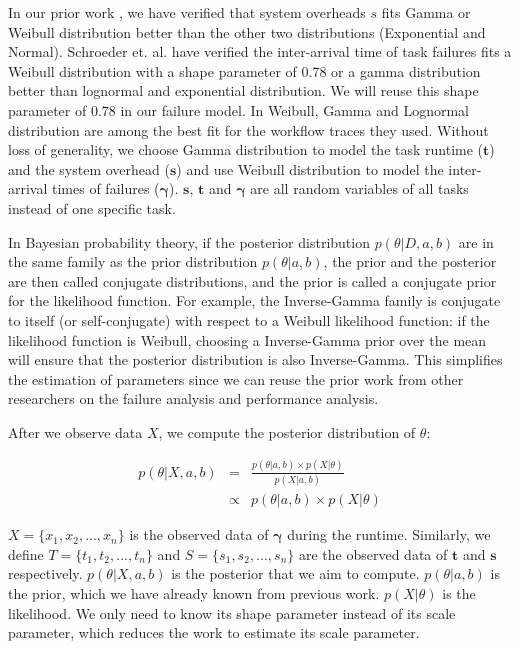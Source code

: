 \documentclass{IOS-Book-Article}
\begin{document}
In our prior work \cite{Chen2011}, we have verified that system overheads $s$ fits Gamma or Weibull distribution better than the other two distributions (Exponential and Normal). Schroeder et. al. \cite{Schroeder2006} have verified the inter-arrival time of task failures fits a Weibull distribution with a shape parameter of 0.78 or a gamma distribution better than lognormal and exponential distribution. We will reuse this shape parameter of 0.78 in our failure model. In \cite{Sun2003, Iosup2008} Weibull, Gamma and Lognormal distribution are among the best fit for the workflow traces they used.  Without loss of generality, we choose Gamma distribution to model the task runtime ($\bm t$) and the system overhead ($\bm s$) and use Weibull distribution to model the inter-arrival times of failures ($\bm\gamma$).  $\bm s$, $\bm t$ and $\bm \gamma$ are all random variables of all tasks instead of one specific task. 

In Bayesian probability theory, if the posterior distribution $p(\theta|D, a, b)$ are in the same family as the prior distribution $p(\theta|a, b)$, the prior and the posterior are then called conjugate distributions, and the prior is called a conjugate prior for the likelihood function. For example, the Inverse-Gamma family is conjugate to itself (or self-conjugate) with respect to a Weibull likelihood function: if the likelihood function is Weibull, choosing a Inverse-Gamma prior over the mean will ensure that the posterior distribution is also Inverse-Gamma. This simplifies the estimation of parameters since we can reuse the prior work from other researchers on the failure analysis and performance analysis. 

After we observe data $X$, we compute the posterior distribution of $\theta$:

\begin{eqnarray}
	\displaystyle  
	p(\theta|X, a, b)&=&\frac{p(\theta|a, b)\times p(X|\theta)}{p(X|a, b)}\nonumber  \\
	&\propto&p(\theta|a, b)\times p(X|\theta)\nonumber 
\end{eqnarray}

$X=\{x_1, x_2, ..., x_n\}$ is the observed data of $\bm\gamma$ during the runtime. Similarly, we define $T=\{t_1, t_2, ..., t_n\}$ and $S=\{s_1, s_2, ..., s_n\}$ are the observed data of $\bm t$ and $\bm s$ respectively. $p(\theta|X,a, b)$ is the posterior that we aim to compute. $p(\theta|a, b)$ is the prior, which we have already known from previous work. $p(X|\theta)$ is the likelihood. We only need to know its shape parameter instead of its scale parameter, which reduces the work to estimate its scale parameter. 
\end{document}
